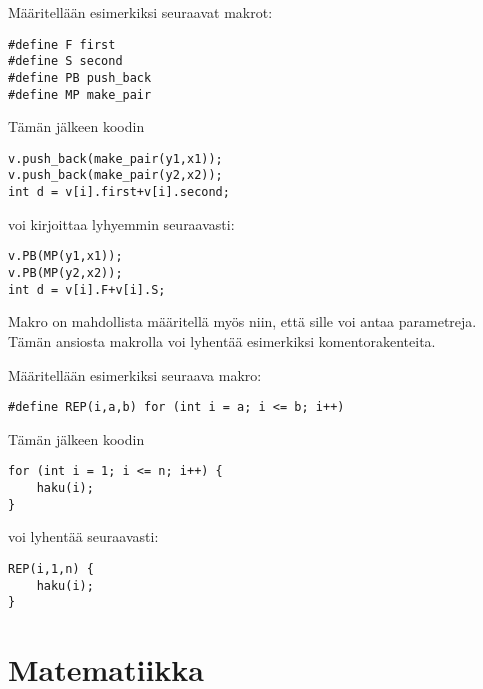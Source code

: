 Määritellään esimerkiksi seuraavat makrot:
\begin{lstlisting}
#define F first
#define S second
#define PB push_back
#define MP make_pair
\end{lstlisting}
Tämän jälkeen koodin
\begin{lstlisting}
v.push_back(make_pair(y1,x1));
v.push_back(make_pair(y2,x2));
int d = v[i].first+v[i].second;
\end{lstlisting}
voi kirjoittaa lyhyemmin seuraavasti:
\begin{lstlisting}
v.PB(MP(y1,x1));
v.PB(MP(y2,x2));
int d = v[i].F+v[i].S;
\end{lstlisting}

Makro on mahdollista määritellä myös niin,
että sille voi antaa parametreja.
Tämän ansiosta makrolla voi lyhentää esimerkiksi
komentorakenteita.

Määritellään esimerkiksi seuraava makro:
\begin{lstlisting}
#define REP(i,a,b) for (int i = a; i <= b; i++)
\end{lstlisting}
Tämän jälkeen koodin
\begin{lstlisting}
for (int i = 1; i <= n; i++) {
    haku(i);
}
\end{lstlisting}
voi lyhentää seuraavasti:
\begin{lstlisting}
REP(i,1,n) {
    haku(i);
}
\end{lstlisting}

% 
% 
% 
% 

\section{Matematiikka}

